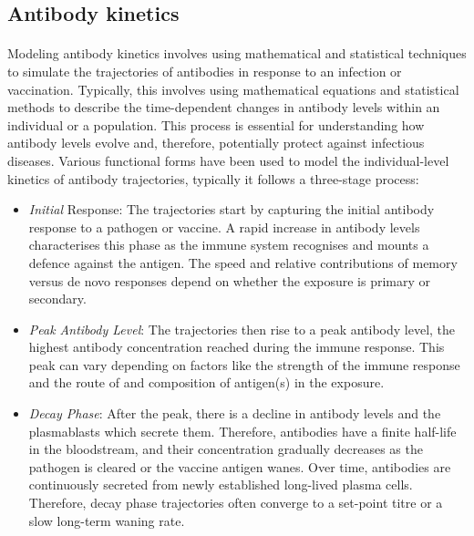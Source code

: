 \subsection{Antibody kinetics}

\paragraph{}Modeling antibody kinetics involves using mathematical and statistical techniques to simulate the trajectories of antibodies in response to an infection or vaccination.\cite{Hay2023-ty} Typically, this involves using mathematical equations and statistical methods to describe the time-dependent changes in antibody levels within an individual or a population. This process is essential for understanding how antibody levels evolve and, therefore, potentially protect against infectious diseases. Various functional forms have been used to model the individual-level kinetics of antibody trajectories,\cite{Garcia-Fogeda2023-yc, Ranjeva2019-go, Hay2019-xu, Srivastava2023-of,Zhao2018-op,Teunis2016-wh} typically it follows a three-stage process:

\begin{itemize}
\item \textit{Initial} Response: The trajectories start by capturing the initial antibody response to a pathogen or vaccine. A rapid increase in antibody levels characterises this phase as the immune system recognises and mounts a defence against the antigen. The speed and relative contributions of memory versus de novo responses depend on whether the exposure is primary or secondary.

\item \textit{Peak Antibody Level}: The trajectories then rise to a peak antibody level, the highest antibody concentration reached during the immune response. This peak can vary depending on factors like the strength of the immune response and the route of and composition of antigen(s) in the exposure.

\item \textit{Decay Phase}: After the peak, there is a decline in antibody levels and the plasmablasts which secrete them. Therefore, antibodies have a finite half-life in the bloodstream, and their concentration gradually decreases as the pathogen is cleared or the vaccine antigen wanes. Over time, antibodies are continuously secreted from newly established long-lived plasma cells. Therefore, decay phase trajectories often converge to a set-point titre or a slow long-term waning rate.\cite{Srivastava2023-of, Amanna2010-zh, Andraud2012-ci}
\end{itemize}


